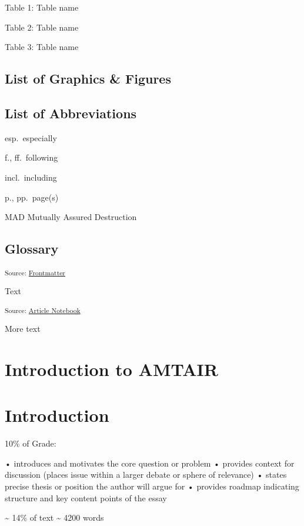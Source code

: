 \documentclass[12pt,a4paper]{book}      %
\begin{document}
Table 1: Table name

Table 2: Table name

Table 3: Table name

\section{List of Graphics \& Figures}\label{list-of-graphics-figures}

\section{List of Abbreviations}\label{list-of-abbreviations}

esp.~especially

f., ff.~following

incl.~including

p., pp.~page(s)

MAD Mutually Assured Destruction

\section{Glossary}\label{glossary}

\textsubscript{Source:
\href{https://VJMeyer.github.io/submission/chapters/Frontmatter.qmd.html\#28d0a0f4-d251-4e12-81c9-5206bbcde8f4}{Frontmatter}}

Text

\textsubscript{Source:
\href{https://VJMeyer.github.io/submission/thesis.qmd.html}{Article
Notebook}}

More text

\chapter{Introduction to AMTAIR}\label{introduction-to-amtair}

\chapter{Introduction}\label{introduction}

10\% of Grade:

• introduces and motivates the core question or problem • provides
context for discussion (places issue within a larger debate or sphere of
relevance) • states precise thesis or position the author will argue for
• provides roadmap indicating structure and key content points of the
essay

\textasciitilde{} 14\% of text \textasciitilde{} 4200 words
\end{document}
